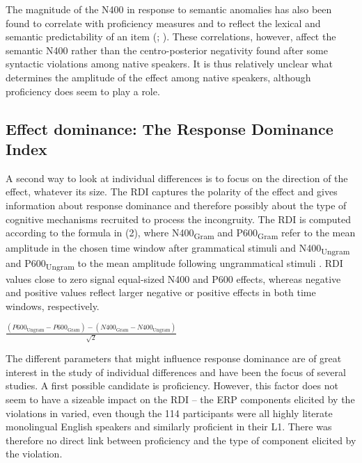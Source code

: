 \documentclass[output=paper,colorlinks,citecolor=brown,modfonts,nonflat]{../langscibook}
\begin{document}
The magnitude of the N400 in response to semantic anomalies has also been found to correlate with proficiency measures \citep{NewmanEtAl2012} and to reflect the lexical and semantic predictability of an item (\citealt{FedermeierKutas1999}; \citealt{DeLongEtAl2005,Federmeier2007}). These correlations, however, affect the semantic N400 rather than the centro-posterior negativity found after some syntactic violations among native speakers. It is thus relatively unclear what determines the amplitude of the effect among native speakers, although proficiency does seem to play a role.

\subsection{Effect dominance: The Response Dominance Index}


A second way to look at individual differences is to focus on the direction of the effect, whatever its size. The RDI captures the polarity of the effect and gives information about response dominance and therefore possibly about the type of cognitive mechanisms recruited to process the incongruity. The RDI is computed according to the formula in (2), where N400\textsubscript{Gram} and P600\textsubscript{Gram} refer to the mean amplitude in the chosen time window after grammatical stimuli and N400\textsubscript{Ungram} and P600\textsubscript{Ungram} to the mean amplitude following ungrammatical stimuli \citep{TannerEtAl2014}. RDI values close to zero signal equal-sized N400 and P600 effects, whereas negative and positive values reflect larger negative or positive effects in both time windows, respectively. \label{bkm:Ref4495949}

\ea
$\frac{\left(P600_{{\text{Ungram}}}-P600_{{\text{Gram}}}\right)-\left(N400_{{\text{Gram}}}-N400_{{\text{Ungram}}}\right)}{\sqrt 2}$
\z

The different parameters that might influence response dominance are of great interest in the study of individual differences and have been the focus of several studies. A first possible candidate is proficiency. However, this factor does not seem to have a sizeable impact on the RDI – the ERP components elicited by the violations in \citet{Tanner2019} varied, even though the 114 participants were all highly literate monolingual English speakers and similarly proficient in their L1. There was therefore no direct link between proficiency and the type of component elicited by the violation. 
\end{document}
